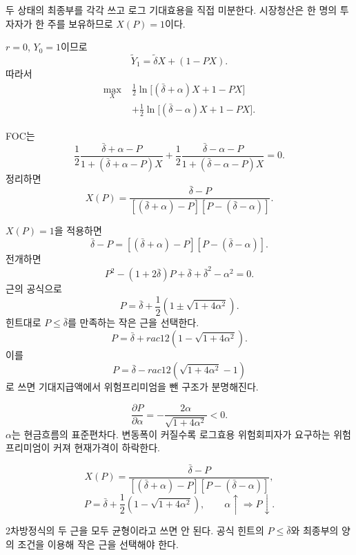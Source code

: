 \begin{strategybox}
두 상태의 최종부를 각각 쓰고 로그 기대효용을 직접 미분한다. 시장청산은 한 명의 투자자가 한 주를 보유하므로 $X(P)=1$이다.
\end{strategybox}

\begin{solutionbox}
$r=0$, $Y_0=1$이므로
\[
\widetilde Y_1=\widetilde\delta X+(1-PX).
\]
따라서
\begin{align*}
\max_X\;&\frac12\ln\bigl[(\bar\delta+\alpha)X+1-PX\bigr]\\
&+\frac12\ln\bigl[(\bar\delta-\alpha)X+1-PX\bigr].
\end{align*}

FOC는
\[
\frac12\frac{\bar\delta+\alpha-P}{1+(\bar\delta+\alpha-P)X}
+\frac12\frac{\bar\delta-\alpha-P}{1+(\bar\delta-\alpha-P)X}=0.
\]
정리하면
\[
\boxed{X(P)=
\frac{\bar\delta-P}
{[(\bar\delta+\alpha)-P][P-(\bar\delta-\alpha)]}}.
\]

$X(P)=1$을 적용하면
\[
\bar\delta-P=[(\bar\delta+\alpha)-P][P-(\bar\delta-\alpha)].
\]
전개하면
\[
P^2-(1+2\bar\delta)P+\bar\delta+\bar\delta^2-\alpha^2=0.
\]
근의 공식으로
\[
P=\bar\delta+\frac12\left(1\pm\sqrt{1+4\alpha^2}\right).
\]
힌트대로 $P\le\bar\delta$를 만족하는 작은 근을 선택한다.
\[
\boxed{P=\bar\delta+rac12\left(1-\sqrt{1+4\alpha^2}\right)}.
\]
이를
\[
P=\bar\delta-rac12\left(\sqrt{1+4\alpha^2}-1\right)
\]
로 쓰면 기대지급액에서 위험프리미엄을 뺀 구조가 분명해진다.

\[
\frac{\partial P}{\partial\alpha}
=-\frac{2\alpha}{\sqrt{1+4\alpha^2}}<0.
\]
$\alpha$는 현금흐름의 표준편차다. 변동폭이 커질수록 로그효용 위험회피자가 요구하는 위험프리미엄이 커져 현재가격이 하락한다.
\end{solutionbox}

\begin{answerbox}
\[
X(P)=
\frac{\bar\delta-P}
{[(\bar\delta+\alpha)-P][P-(\bar\delta-\alpha)]},
\]
\[
P=\bar\delta+\frac12\left(1-\sqrt{1+4\alpha^2}\right),
\qquad
\alpha\uparrow\Rightarrow P\downarrow.
\]
\end{answerbox}

\begin{warningbox}
2차방정식의 두 근을 모두 균형이라고 쓰면 안 된다. 공식 힌트의 $P\le\bar\delta$와 최종부의 양의 조건을 이용해 작은 근을 선택해야 한다.
\end{warningbox}
